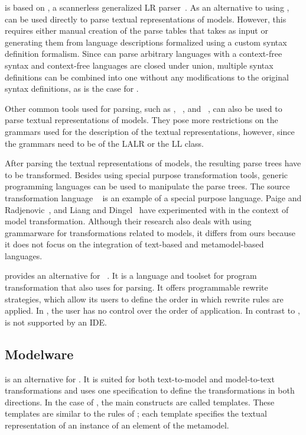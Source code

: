 \SDF is based on \SGLR, a scannerless generalized LR parser~\cite{Vis97.thesis}.
As an alternative to using \SDF, \SGLR can be used directly to parse textual representations of models.
However, this requires either manual creation of the parse tables that \SGLR takes as input or generating them from language descriptions formalized using a custom syntax definition formalism.
Since \SGLR can parse arbitrary languages with a context-free syntax and context-free languages are closed under union, multiple syntax definitions can be combined into one without any modifications to the original syntax definitions, as is the case for \SDF.

Other common tools used for parsing, such as \ANTLR, \JavaCC~\cite{JavaCC}, and \YACC~\cite{Joh75.yacc}, can also be used to parse textual representations of models.
They pose more restrictions on the grammars used for the description of the textual representations, however, since the grammars need to be of the LALR or the LL class.

After parsing the textual representations of models, the resulting parse trees have to be transformed.
Besides using special purpose transformation tools, generic programming languages can be used to manipulate the parse trees.
The source transformation language \TXL~\cite{TXL-Cordy} is an example of a special purpose language.
Paige and Radjenovic~\cite{TXLtowards}, and Liang and Dingel~\cite{TXLeval} have experimented with \TXL in the context of model transformation.
Although their research also deals with using grammarware for transformations related to models, it differs from ours because it does not focus on the integration of text-based and metamodel-based languages.

\StrategoXT provides an alternative for \ASFSDF~\cite{BravenboerKVV08}.
It is a language and toolset for program transformation that also uses \SDF for parsing.
It offers programmable rewrite strategies, which allow its users to define the order in which rewrite rules are applied.
In \ASFSDF, the user has no control over the order of application.
In contrast to \ASFSDF, \StrategoXT is not supported by an IDE.

\subsection{Modelware}
\label{sub:grammars-and-metamodels:related-Modelware}

\TCS \cite{TCS} is an alternative for \Xtext.
It is suited for both text-to-model and model-to-text transformations and uses one specification to define the transformations in both directions.
In the case of \TCS, the main constructs are called templates.
These templates are similar to the rules of \Xtext; each template specifies the textual representation of an instance of an element of the metamodel.

